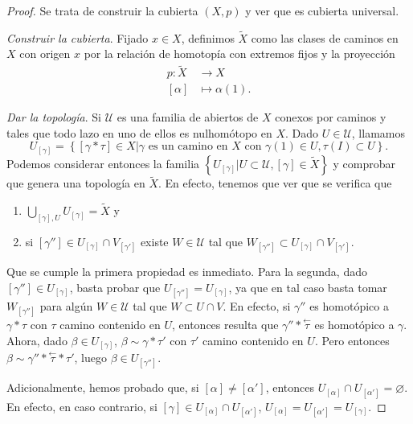 \documentclass[12pt,a4paper]{book}
\theoremstyle{definition} \newtheorem{defn}[thm]{Definición}
\theoremstyle{definition} \newtheorem{ejemplo}[thm]{Ejemplo}
\theoremstyle{definition} \newtheorem{ejercicio}[thm]{Ejercicio}
\theoremstyle{remark} \newtheorem*{obs}{Observación}
\def\XX{\tilde{X}}
\newcommand\cev[1]{\overset{\leftarrow}{#1}}
\begin{document}
\begin{proof}
  Se trata de construir la cubierta $(X,p)$ y ver que es cubierta universal. 

  \textit{Construir la cubierta}. Fijado $x\in X$, definimos $\XX$ como las clases de caminos en $X$ con origen $x$ por la relación de homotopía con extremos fijos y la proyección
  \begin{align*}
    p :\XX&\longrightarrow X\\ 
    [\alpha] &\longmapsto \alpha(1) .
    \end{align*}

    \textit{Dar la topología}. Si $\mathcal{U}$ es una familia de abiertos de $X$ conexos por caminos y tales que todo lazo en uno de ellos es nulhomótopo en $X$. Dado $U\in \mathcal{U}$, llamamos
    \begin{equation*}
      U_{[\gamma]}=\left\{ [\gamma*\tau] \in X |\gamma \text{ es un camino en } X \text{ con } \gamma(1)\in U, \tau(I) \subset U \right\}.
    \end{equation*}
    Podemos considerar entonces la familia $\left\{ U_{[\gamma]}|U\subset \mathcal{U}, [\gamma] \in \XX \right\}$ y comprobar que genera una topología en $\XX$. En efecto, tenemos que ver que se verifica que
\begin{enumerate}
  \item $\bigcup_{[\gamma], U}U_{[\gamma]}=\XX$ y 
  \item si $[\gamma'']\in U_{[\gamma]}\cap V_{[\gamma']}$ existe $W\in \mathcal{U}$ tal que $W_{[\gamma'']}\subset U_{[\gamma]}\cap V_{[\gamma']}$.
\end{enumerate}

    Que se cumple la primera propiedad es inmediato. Para la segunda, dado $[\gamma'']\in U_{[\gamma]}$, basta probar que $U_{[\gamma'']}=U_{[\gamma]}$, ya que en tal caso basta tomar $W_{[\gamma'']}$ para algún $W\in \mathcal{U}$ tal que $W\subset U\cap V$. En efecto, si $\gamma''$ es homotópico a $\gamma*\tau$ con $\tau$ camino contenido en $U$, entonces resulta que $\gamma''*\cev{\tau}$ es homotópico a $\gamma$. Ahora, dado $\beta\in U_{[\gamma]}$, $\beta\sim \gamma*\tau'$ con $\tau'$ camino contenido en $U$. Pero entonces $\beta \sim \gamma''*\cev{\tau}*\tau'$, luego $\beta \in U_{[\gamma'']}$.
    
    Adicionalmente, hemos probado que, si $[\alpha]\neq[\alpha']$, entonces $U_{[\alpha]}\cap U_{[\alpha']}=\varnothing$. En efecto, en caso contrario, si $[\gamma]\in U_{[\alpha]}\cap U_{[\alpha']}$, $U_{[\alpha]}=U_{[\alpha']}=U_{[\gamma]}$.


\end{proof}
\end{document}
